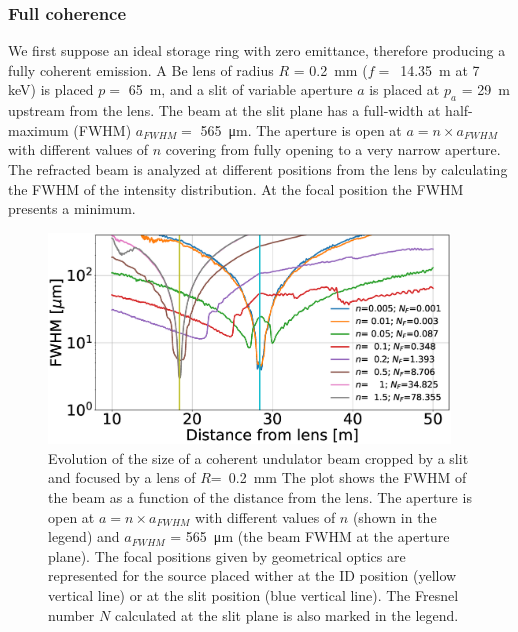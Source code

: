 \documentclass{iucr}              %
\begin{document}
\subsubsection{Full coherence} We first suppose an ideal storage ring with zero emittance, therefore producing a fully coherent emission. A Be lens of radius $R$ = \SI{0.2}{\milli\meter} ($f=$~\SI{14.35}{\meter} at 7 keV) is placed $p=$ \SI{65}{\meter}, and a slit of variable aperture $a$ is placed at $p_a$ = \SI{29}{\meter} upstream from the lens. The beam at the slit plane has a full-width at half-maximum (FWHM) $a_{FWHM}=$ \SI{565}{\micro\meter}. The aperture is open at $a = n \times a_{FWHM}$ with different values of $n$ covering from fully opening to a very narrow aperture. The refracted beam is analyzed at different positions from the lens by calculating the FWHM of the intensity distribution. At the focal position the FWHM presents a minimum. 

\begin{figure}\label{fig:oneTFund}
    \centering
    \includegraphics[width=0.95\textwidth]{figures/oneTF_UndSource_RectSlit_R200um.eps}

    \caption{Evolution of the size of a coherent undulator beam cropped by a slit and focused by a lens of $R$=~\SI{0.2}{\milli\meter} 
    The plot shows the FWHM of the beam  as a function of the distance from the lens. The aperture is open at $a = n \times a_{FWHM}$ with different values of $n$ (shown in the legend) and $a_{FWHM}$ = \SI{565}{\micro\meter} (the beam FWHM at the aperture plane). The focal positions given by geometrical optics are represented for the source placed wither at the ID position (yellow vertical line) or at the slit position (blue vertical line).
    The Fresnel number $N$ calculated at the slit plane is also marked in the legend.
    }
\end{figure}
\end{document}
